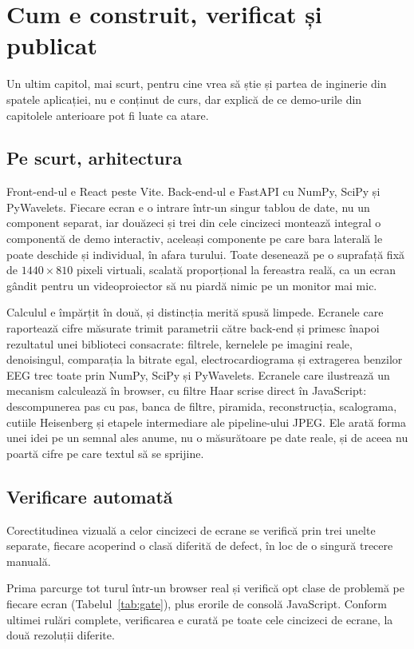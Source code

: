 \chapter{Cum e construit, verificat și publicat}
\label{ch:tehnic}

Un ultim capitol, mai scurt, pentru cine vrea să știe și partea de
inginerie din spatele aplicației, nu e conținut de curs, dar explică de ce
demo-urile din capitolele anterioare pot fi luate ca atare.

\section{Pe scurt, arhitectura}

Front-end-ul e React peste Vite. Back-end-ul e FastAPI cu NumPy, SciPy și
PyWavelets. Fiecare ecran e o intrare într-un singur tablou de date, nu un
component separat, iar douăzeci și trei din cele cincizeci montează integral
o componentă de demo interactiv, aceleași componente pe care bara laterală
le poate deschide și individual, în afara turului. Toate desenează pe o
suprafață fixă de $1440\times 810$ pixeli virtuali, scalată proporțional la
fereastra reală, ca un ecran gândit pentru un videoproiector să nu piardă
nimic pe un monitor mai mic.

Calculul e împărțit în două, și distincția merită spusă limpede. Ecranele
care raportează cifre măsurate trimit parametrii către back-end și primesc
înapoi rezultatul unei biblioteci consacrate: filtrele, kernelele pe imagini
reale, denoisingul, comparația la bitrate egal, electrocardiograma și
extragerea benzilor EEG trec toate prin NumPy, SciPy și PyWavelets. Ecranele
care ilustrează un mecanism calculează în browser, cu filtre Haar scrise
direct în JavaScript: descompunerea pas cu pas, banca de filtre, piramida,
reconstrucția, scalograma, cutiile Heisenberg și etapele intermediare ale
pipeline-ului JPEG. Ele arată forma unei idei pe un semnal ales anume, nu o
măsurătoare pe date reale, și de aceea nu poartă cifre pe care textul să se
sprijine.

\section{Verificare automată}
\label{sec:gate}

Corectitudinea vizuală a celor cincizeci de ecrane se verifică prin trei
unelte separate, fiecare acoperind o clasă diferită de defect, în loc de o
singură trecere manuală.

Prima parcurge tot turul într-un browser real și verifică opt clase de
problemă pe fiecare ecran (Tabelul~\ref{tab:gate}), plus erorile de consolă
JavaScript. Conform ultimei rulări complete, verificarea e curată pe toate
cele cincizeci de ecrane, la două rezoluții diferite.

